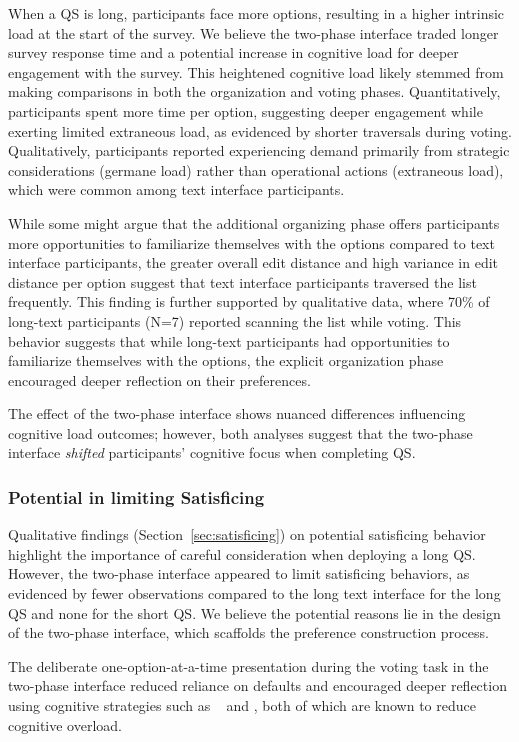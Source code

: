 When a QS is long, participants face more options, resulting in a higher intrinsic load at the start of the survey. We believe the two-phase interface traded longer survey response time and a potential increase in cognitive load for deeper engagement with the survey. This heightened cognitive load likely stemmed from making comparisons in both the organization and voting phases. Quantitatively, participants spent more time per option, suggesting deeper engagement while exerting limited extraneous load, as evidenced by shorter traversals during voting. Qualitatively, participants reported experiencing demand primarily from strategic considerations (germane load) rather than operational actions (extraneous load), which were common among text interface participants.

While some might argue that the additional organizing phase offers participants more opportunities to familiarize themselves with the options compared to text interface participants, the greater overall edit distance and high variance in edit distance per option suggest that text interface participants traversed the list frequently. This finding is further supported by qualitative data, where 70\% of long-text participants (N=7) reported scanning the list while voting. This behavior suggests that while long-text participants had opportunities to familiarize themselves with the options, the explicit organization phase encouraged deeper reflection on their preferences.

The effect of the two-phase interface shows nuanced differences influencing cognitive load outcomes; however, both analyses suggest that the two-phase interface \textit{shifted} participants' cognitive focus when completing QS.

\subsubsection{Potential in limiting Satisficing}
Qualitative findings (Section~\ref{sec:satisficing}) on potential satisficing behavior highlight the importance of careful consideration when deploying a long QS. However, the two-phase interface appeared to limit satisficing behaviors, as evidenced by fewer observations compared to the long text interface for the long QS and none for the short QS. We believe the potential reasons lie in the design of the two-phase interface, which scaffolds the preference construction process.

The deliberate one-option-at-a-time presentation during the voting task in the two-phase interface reduced reliance on defaults and encouraged deeper reflection using cognitive strategies such as \textit{}~\cite{simonSciencesArtificial1996} and \textit{}, both of which are known to reduce cognitive overload.

